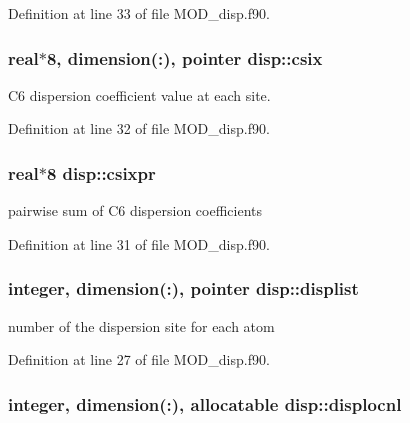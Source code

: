 Definition at line 33 of file M\-O\-D\-\_\-disp.\-f90.

\hypertarget{classdisp_aa5d199a19305f4f88c604197115716cc}{
\subsubsection[{csix}]{\setlength{\rightskip}{0pt plus 5cm}real$\ast$8, dimension(\-:), pointer disp\-::csix}}\label{classdisp_aa5d199a19305f4f88c604197115716cc}


C6 dispersion coefficient value at each site. 



Definition at line 32 of file M\-O\-D\-\_\-disp.\-f90.

\hypertarget{classdisp_a5f79cf27d59c5a6b9f791a5e12e3e9d8}{
\subsubsection[{csixpr}]{\setlength{\rightskip}{0pt plus 5cm}real$\ast$8 disp\-::csixpr}}\label{classdisp_a5f79cf27d59c5a6b9f791a5e12e3e9d8}


pairwise sum of C6 dispersion coefficients 



Definition at line 31 of file M\-O\-D\-\_\-disp.\-f90.

\hypertarget{classdisp_a5e4e29125e6b9523897ffbf9a812fb2c}{
\subsubsection[{displist}]{\setlength{\rightskip}{0pt plus 5cm}integer, dimension(\-:), pointer disp\-::displist}}\label{classdisp_a5e4e29125e6b9523897ffbf9a812fb2c}


number of the dispersion site for each atom 



Definition at line 27 of file M\-O\-D\-\_\-disp.\-f90.

\hypertarget{classdisp_a4ecfe2ba143fd63d6c823145aa81da9d}{
\subsubsection[{displocnl}]{\setlength{\rightskip}{0pt plus 5cm}integer, dimension(\-:), allocatable disp\-::displocnl}}\label{classdisp_a4ecfe2ba143fd63d6c823145aa81da9d}


